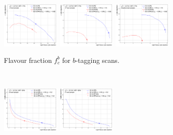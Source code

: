 \begin{figure}[h!]
  \centering
  \begin{subfigure}[b]{\textwidth}
      \centering
      \includegraphics[width=0.32\textwidth]{Images/FTAG/VRDL1d/scansfraction/thesis_plot_frac/cf_ttbar_200.png}
      \includegraphics[width=0.32\textwidth]{Images/FTAG/VRDL1d/scansfraction/thesis_plot_frac/cf_zpext_200.png}
      \includegraphics[width=0.32\textwidth]{Images/FTAG/VRDL1d/scansfraction/thesis_plot_frac/cf_graviton_200.png}
      \caption{Flavour fraction $f_c^b$ for $b$-tagging scans.} 
      \label{fig:DL1dVRscanfb}
  \end{subfigure}\\
  \begin{subfigure}[b]{\textwidth}
    \centering %
    \includegraphics[width=0.32\textwidth]{Images/FTAG/VRDL1d/scansfraction/thesis_plot_frac_c/cf_ttbar_2000.png}
    \includegraphics[width=0.32\textwidth]{Images/FTAG/VRDL1d/scansfraction/thesis_plot_frac_c/cf_zpext_2000.png}

\end{subfigure}
\end{figure}
